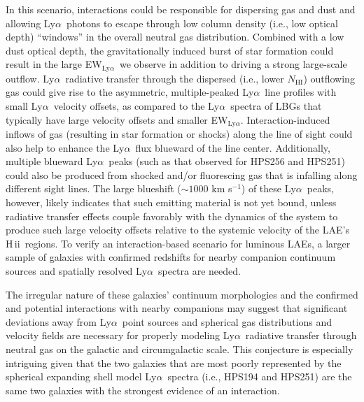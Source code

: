 \documentclass{emulateapj}
\newcommand{\lya}{Ly$\alpha$}
\def\nh{$N_{\mathrm{HI}}$}
\def\ewlya{EW$_{\mathrm{Ly}\alpha}$}
\def\hii{H\,{\sc ii}}
\begin{document}
In this scenario, interactions could be responsible for dispersing gas and dust and allowing \lya\ photons to escape through low column density (i.e., low optical depth) ``windows'' in the overall neutral gas distribution. Combined with a low dust optical depth, the gravitationally induced burst of star formation could result in the large \ewlya\ we observe in addition to driving a strong large-scale outflow. \lya\ radiative transfer through the dispersed (i.e., lower \nh) outflowing gas could give rise to the asymmetric, multiple-peaked \lya\ line profiles with small \lya\ velocity offsets, as compared to the \lya\ spectra of LBGs that typically have large velocity offsets and smaller \ewlya. Interaction-induced inflows of gas (resulting in star formation or shocks) along the line of sight could also help to enhance the \lya\ flux blueward of the line center. Additionally, multiple blueward \lya\ peaks (such as that observed for HPS256 and HPS251) could also be produced from shocked and/or fluorescing gas that is infalling along different sight lines. The large blueshift ($\sim1000$ km s$^{-1}$) of these \lya\ peaks, however, likely indicates that such emitting material is not yet bound, unless radiative transfer effects couple favorably with the dynamics of the system to produce such large velocity offsets relative to the systemic velocity of the LAE's \hii\ regions. To verify an interaction-based scenario for luminous LAEs, a larger sample of galaxies with confirmed redshifts for nearby companion continuum sources and spatially resolved \lya\ spectra are needed. 

The irregular nature of these galaxies' continuum morphologies and the confirmed and potential interactions with nearby companions may suggest that significant deviations away from \lya\ point sources and spherical gas distributions and velocity fields are necessary for properly modeling \lya\ radiative transfer through neutral gas on the galactic and circumgalactic scale. This conjecture is especially intriguing given that the two galaxies that are most poorly represented by the spherical expanding shell model \lya\ spectra (i.e., HPS194 and HPS251) are the same two galaxies with the strongest evidence of an interaction.

\end{document}
